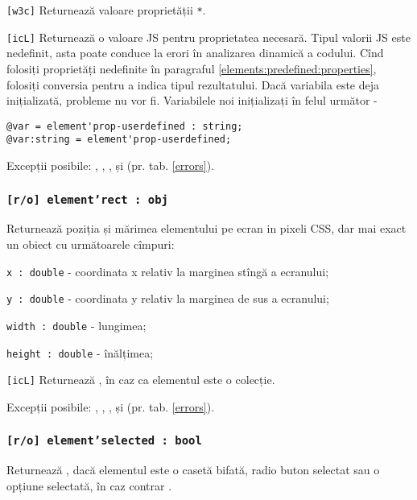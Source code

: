 \texttt{[w3c]} Returnează valoare proprietății \texttt{*}.

\texttt{[icL]}  Returnează o valoare JS pentru proprietatea necesară. Tipul valorii JS este nedefinit, asta poate conduce la erori în analizarea dinamică a codului. Cînd folosiți proprietăți nedefinite în paragraful \ref{elements:predefined:properties}, folosiți conversia pentru a indica tipul rezultatului. Dacă variabila este deja inițializată, probleme nu vor fi. Variabilele noi inițializați în felul următor -
\begin{verbatim}
@var = element'prop-userdefined : string;
@var:string = element'prop-userdefined;
\end{verbatim}

Excepții posibile: , , ,  și  (pr. tab. \ref{errors}).

\subsubsection{\texttt{[r/o] element'rect : obj}}

Returnează poziția și mărimea elementului pe ecran in pixeli CSS, dar mai exact un obiect cu următoarele cîmpuri:
\begin{icItems}
	\item \texttt{x : double} - coordinata x relativ la marginea stîngă a ecranului;
	\item \texttt{y : double} - coordinata y relativ la marginea de sus a ecranului;
	\item \texttt{width : double} - lungimea;
	\item \texttt{height : double} - înălțimea;
\end{icItems}

\texttt{[icL]} Returnează \set, în caz ca elementul este o colecție.

Excepții posibile: , , ,  și  (pr. tab. \ref{errors}).

\subsubsection{\texttt{[r/o] element'selected : bool}}

Returnează \true, dacă elementul este o casetă bifată, radio buton selectat sau o opțiune selectată, în caz contrar \false.


